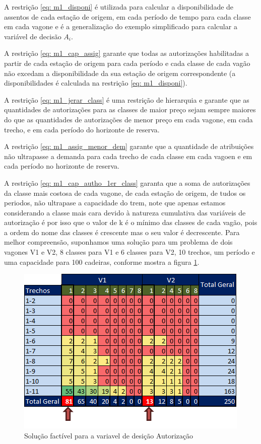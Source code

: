 A restrição \ref{eq: m1_disponi} é utilizada para calcular a disponibilidade de assentos de cada estação de origem, em cada período de tempo para cada classe em cada vagone e é a generalização do exemplo simplificado para calcular a variável de decisão $A_i$.

A restrição \ref{eq: m1_cap_assig} garante que todas as autorizações habilitadas a partir de cada estação de origem para cada período e cada classe de cada vagão não excedam a disponibilidade da sua estação de origem correspondente (a disponibilidades é calculada na restrição \ref{eq: m1_disponi}).

A restrição \ref{eq: m1_jerar_class} é uma restrição de hierarquia e garante que as quantidades de autorizações para as classes de maior preço sejam sempre maiores do que as quantidades de autorizações de menor preço em cada vagone, em cada trecho, e em  cada período do horizonte de reserva.

A restrição \ref{eq: m1_assig_menor_dem} garante que a quantidade de atribuições não ultrapasse a demanda para cada trecho de cada classe em cada vagoen e em cada período no horizonte de reserva.

A restrição \ref{eq: m1_cap_autho_1er_class} garanta que a soma de autorizações da classe mais costosa de cada vagone, de cada estação de origem, de tudos os periodos, não ultrapase a capacidade do trem, note que apenas estamos considerando a classe mais cara devido à natureza cumulativa das variáveis de autorização é por isso que o valor de k é o mínimo das classes de cada vagão, pois a ordem do nome das classes é crescente mas o seu valor é decrescente. Para melhor compreensão, suponhamos uma solução para um problema de dois vagones V1 e V2, 8 classes para V1 e 6 classes para V2, 10 trechos, um período e uma capacidade para 100 cadeiras, conforme mostra a figura \ref{fig: autorization}.

\begin{figure}[!ht]
	\begin{center}
		\includegraphics[scale=0.7]{img/autorization.png}
		\caption{Solução factível para a variavel de desição Autorização}
		\label{fig: autorization}
	\end{center}
\end{figure}

